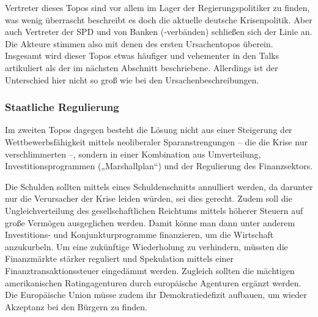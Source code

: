 Vertreter dieses Topos sind vor allem im Lager der Regierungspolitiker zu finden, was wenig überrascht beschreibt es doch die aktuelle deutsche Krisenpolitik. Aber auch Vertreter der SPD und von Banken (-verbänden) schließen sich der Linie an. Die Akteure stimmen also mit denen des ersten Ursachentopos überein. Insgesamt wird dieser Topos etwas häufiger und vehementer in den Talks artikuliert als der im nächsten Abschnitt beschriebene. Allerdings ist der Unterschied hier nicht so groß wie bei den Ursachenbeschreibungen.

\subsubsection{Staatliche Regulierung}

Im zweiten Topos dagegen besteht die Lösung nicht aus einer Steigerung der Wettbewerbsfähigkeit mittels neoliberaler Sparanstrengungen – die die Krise nur verschlimmerten –, sondern in einer Kombination aus Umverteilung, Investitionsprogrammen („Marshallplan“) und der Regulierung des Finanzsektors.

Die Schulden sollten mittels eines Schuldenschnitts annulliert werden, da darunter nur die Verursacher der Krise leiden würden, sei dies gerecht. Zudem soll die Ungleichverteilung des gesellschaftlichen Reichtums mittels höherer Steuern auf große Vermögen ausgeglichen werden. Damit könne man dann unter anderem Investitions- und Konjunkturprogramme finanzieren, um die Wirtschaft anzukurbeln. Um eine zukünftige Wiederholung zu verhindern, müssten die Finanzmärkte stärker reguliert und Spekulation mittels einer Finanztransaktionssteuer eingedämmt werden. Zugleich sollten die mächtigen amerikanischen Ratingagenturen durch europäische Agenturen ergänzt werden. Die Europäische Union müsse zudem ihr Demokratiedefizit aufbauen, um wieder Akzeptanz bei den Bürgern zu finden.

